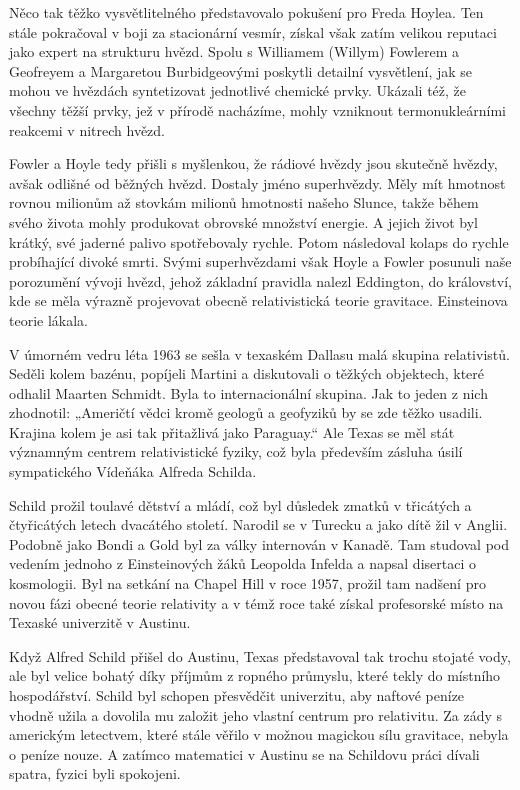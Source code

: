   Něco tak těžko vysvětlitelného představovalo pokušení pro Freda Hoylea. Ten stále pokračoval v
  boji za stacionární vesmír, získal však zatím velikou reputaci jako expert na strukturu hvězd.
  Spolu s Williamem (Willym) Fowlerem a Geofreyem a Margaretou Burbidgeovými poskytli detailní
  vysvětlení, jak se mohou ve hvězdách syntetizovat jednotlivé chemické prvky. Ukázali též, že
  všechny těžší prvky, jež v přírodě nacházíme, mohly vzniknout termonukleárními reakcemi v nitrech
  hvězd. 

  Fowler a Hoyle tedy přišli s myšlenkou, že rádiové hvězdy jsou skutečně hvězdy, avšak odlišné od
  běžných hvězd. Dostaly jméno superhvězdy. Měly mít hmotnost rovnou milionům až stovkám milionů
  hmotnosti našeho Slunce, takže během svého života mohly produkovat obrovské množství energie. A
  jejich život byl krátký, své jaderné palivo spotřebovaly rychle. Potom následoval kolaps do rychle
  probíhající divoké smrti. Svými superhvězdami však Hoyle a Fowler posunuli naše porozumění vývoji
  hvězd, jehož základní pravidla nalezl Eddington, do království, kde se měla výrazně projevovat
  obecně relativistická teorie gravitace. Einsteinova teorie lákala. 

  V úmorném vedru léta 1963 se sešla v texaském Dallasu malá skupina relativistů. Seděli kolem
  bazénu, popíjeli Martini a diskutovali o těžkých objektech, které odhalil Maarten Schmidt. Byla to
  internacionální skupina. Jak to jeden z nich zhodnotil: „Američtí vědci kromě geologů a geofyziků
  by se zde těžko usadili. Krajina kolem je asi tak přitažlivá jako Paraguay.“ Ale Texas se měl stát
  významným centrem relativistické fyziky, což byla především zásluha úsilí sympatického Vídeňáka
  Alfreda Schilda. 

  Schild prožil toulavé dětství a mládí, což byl důsledek zmatků v třicátých a čtyřicátých letech
  dvacátého století. Narodil se v Turecku a jako dítě žil v Anglii. Podobně jako Bondi a Gold byl za
  války internován v Kanadě. Tam studoval pod vedením jednoho z Einsteinových žáků Leopolda Infelda
  a napsal disertaci o kosmologii. Byl na setkání na Chapel Hill v roce 1957, prožil tam nadšení pro
  novou fázi obecné teorie relativity a v témž roce také získal profesorské místo na Texaské
  univerzitě v Austinu. 

  Když Alfred Schild přišel do Austinu, Texas představoval tak trochu stojaté vody, ale byl velice
  bohatý díky příjmům z ropného průmyslu, které tekly do místního hospodářství. Schild byl schopen
  přesvědčit univerzitu, aby naftové peníze vhodně užila a dovolila mu založit jeho vlastní centrum
  pro relativitu. Za zády s americkým letectvem, které stále věřilo v možnou magickou sílu
  gravitace, nebyla o peníze nouze. A zatímco matematici v Austinu se na Schildovu práci dívali
  spatra, fyzici byli spokojeni. 

